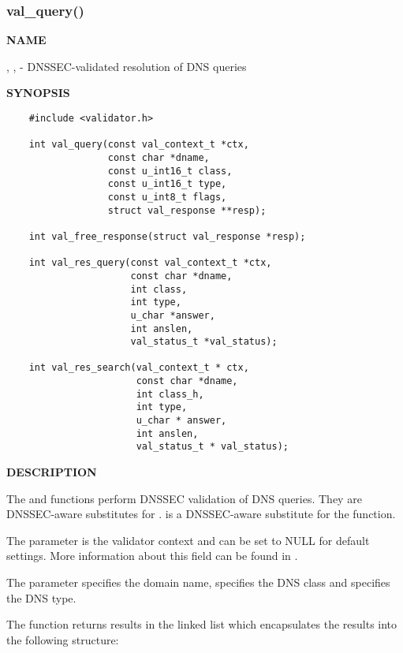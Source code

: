 \clearpage

\subsubsection{val\_query()}

{\bf NAME}

, ,  -
DNSSEC-validated resolution of DNS queries

{\bf SYNOPSIS}

\begin{verbatim}
    #include <validator.h>

    int val_query(const val_context_t *ctx,
                  const char *dname,
                  const u_int16_t class,
                  const u_int16_t type,
                  const u_int8_t flags,
                  struct val_response **resp);

    int val_free_response(struct val_response *resp);

    int val_res_query(const val_context_t *ctx,
                      const char *dname,
                      int class,
                      int type,
                      u_char *answer,
                      int anslen,
                      val_status_t *val_status);

    int val_res_search(val_context_t * ctx,
                       const char *dname,
                       int class_h,
                       int type,
                       u_char * answer,
                       int anslen,
                       val_status_t * val_status);
\end{verbatim}

{\bf DESCRIPTION}

The  and   functions perform DNSSEC
validation of DNS queries.  They are DNSSEC-aware substitutes for
.   is a DNSSEC-aware substitute
for the  function.

The  parameter is the validator context and can be set to NULL for
default settings.  More information about this field can be found in
.

The  parameter specifies the domain name,  specifies the
DNS class and  specifies the DNS type.

The  function returns results in the  linked list
which encapsulates the results into the following structure:

